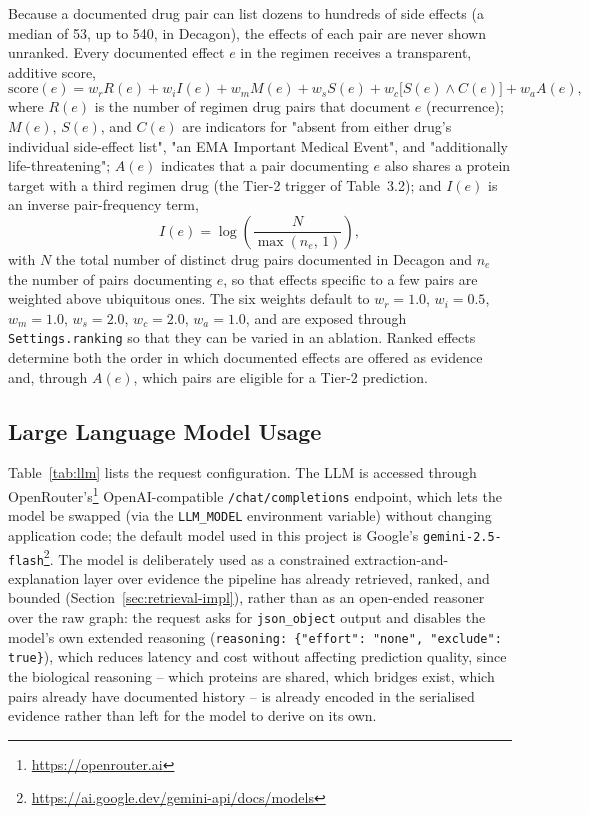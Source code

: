 Because a documented drug pair can list dozens to hundreds of side effects
(a median of 53, up to 540, in Decagon), the effects of each pair are never
shown unranked. Every documented effect $e$ in the regimen receives a
transparent, additive score,
\begin{equation}
  \mathrm{score}(e) = w_r R(e) + w_i I(e) + w_m M(e) + w_s S(e)
                     + w_c\big[S(e)\wedge C(e)\big] + w_a A(e),
  \label{eq:score}
\end{equation}
where $R(e)$ is the number of regimen drug pairs that document $e$
(recurrence); $M(e)$, $S(e)$, and $C(e)$ are indicators for "absent from
either drug's individual side-effect list", "an EMA Important Medical
Event", and "additionally life-threatening"; $A(e)$ indicates that a pair
documenting $e$ also shares a protein target with a third regimen drug (the
Tier-2 trigger of Table~3.2); and $I(e)$ is an inverse pair-frequency term,
\begin{equation}
  I(e) = \log\!\left(\frac{N}{\max(n_e,\,1)}\right),
  \label{eq:idf}
\end{equation}
with $N$ the total number of distinct drug pairs documented in Decagon and
$n_e$ the number of pairs documenting $e$, so that effects specific to a
few pairs are weighted above ubiquitous ones. The six weights default to
$w_r{=}1.0$, $w_i{=}0.5$, $w_m{=}1.0$, $w_s{=}2.0$, $w_c{=}2.0$, $w_a{=}1.0$,
and are exposed through \texttt{Settings.ranking} so that they can be varied
in an ablation. Ranked effects determine both the order in which documented
effects are offered as evidence and, through $A(e)$, which pairs are
eligible for a Tier-2 prediction.

\subsection{Large Language Model Usage}
\label{sec:llm-usage}

Table~\ref{tab:llm} lists the request configuration. The LLM is accessed
through OpenRouter's\footnote{\url{https://openrouter.ai}} OpenAI-compatible
\texttt{/chat/completions} endpoint, which lets the model be swapped (via
the \texttt{LLM\_MODEL} environment variable) without changing application
code; the default model used in this project is Google's
\texttt{gemini-2.5-flash}\footnote{\url{https://ai.google.dev/gemini-api/docs/models}}.
The model is deliberately used as a constrained extraction-and-explanation
layer over evidence the pipeline has already retrieved, ranked, and bounded
(Section~\ref{sec:retrieval-impl}), rather than as an open-ended reasoner
over the raw graph: the request asks for \texttt{json\_object} output and
disables the model's own extended reasoning
(\texttt{reasoning: \{"effort": "none", "exclude": true\}}), which reduces
latency and cost without affecting prediction quality, since the biological
reasoning -- which proteins are shared, which bridges exist, which pairs
already have documented history -- is already encoded in the serialised
evidence rather than left for the model to derive on its own.

